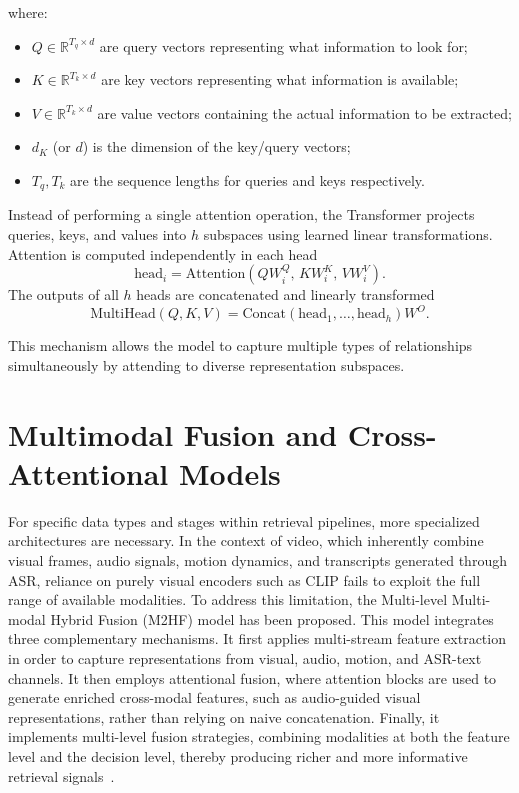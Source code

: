 where:
\begin{itemize}
    \item $Q \in \mathbb{R}^{T_q \times d}$ are query vectors representing what information to look for;
    \item $K \in \mathbb{R}^{T_k \times d}$ are key vectors representing what information is available;
    \item $V \in \mathbb{R}^{T_k \times d}$ are value vectors containing the actual information to be extracted;
    \item $d_K$ (or $d$) is the dimension of the key/query vectors;
    \item $T_q, T_k$ are the sequence lengths for queries and keys respectively.
\end{itemize}

Instead of performing a single attention operation, the Transformer projects queries, keys, and values into $h$ subspaces using learned linear transformations. Attention is computed independently in each head
\[
\text{head}_{i} = \mathrm{Attention}(QW_i^{Q},\, KW_i^{K},\, VW_i^{V}).
\]
The outputs of all $h$ heads are concatenated and linearly transformed
\[
\mathrm{MultiHead}(Q,K,V) = 
\mathrm{Concat}(\text{head}_1, \ldots, \text{head}_h) W^{O}.
\]

This mechanism allows the model to capture multiple types of relationships simultaneously by attending to diverse representation subspaces.


\section{Multimodal Fusion and Cross-Attentional Models}

For specific data types and stages within retrieval pipelines, more specialized architectures are necessary. In the context of video, which inherently combine visual frames, audio signals, motion dynamics, and transcripts generated through ASR, reliance on purely visual encoders such as CLIP fails to exploit the full range of available modalities. To address this limitation, the Multi-level Multi-modal Hybrid Fusion (M2HF) model has been proposed. This model integrates three complementary mechanisms. It first applies multi-stream feature extraction in order to capture representations from visual, audio, motion, and ASR-text channels. It then employs attentional fusion, where attention blocks are used to generate enriched cross-modal features, such as audio-guided visual representations, rather than relying on naive concatenation. Finally, it implements multi-level fusion strategies, combining modalities at both the feature level and the decision level, thereby producing richer and more informative retrieval signals~\cite{liu2022m2hf}.

